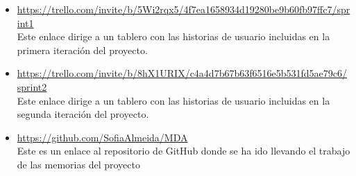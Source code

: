 \documentclass[11pt]{article}
\begin{document}
\begin{itemize}
\item \url{https://trello.com/invite/b/5Wi2rqx5/4f7ea1658934d19280be9b60fb97ffc7/sprint1} \\

Este enlace dirige a un tablero con las historias de usuario incluidas en la primera iteración del proyecto. 

\item \url{https://trello.com/invite/b/8hX1URIX/c4a4d7b67b63f6516e5b531fd5ae79c6/sprint2} \\

Este enlace dirige a un tablero con las historias de usuario incluidas en la segunda iteración del proyecto. 

\item \url{https://github.com/SofiaAlmeida/MDA} \\
Este es un enlace al repositorio de GitHub donde se ha ido llevando el trabajo de las memorias del proyecto


\end{itemize}
\end{document}
